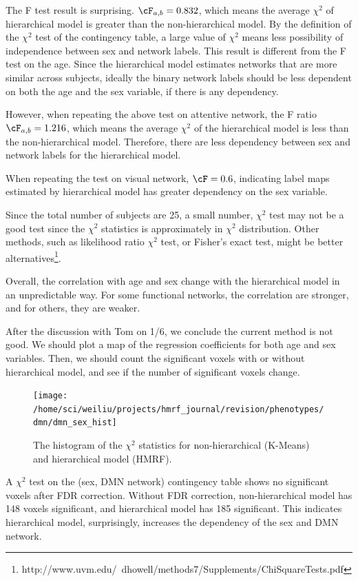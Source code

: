 \documentclass[12pt]{article}
\begin{document}
The F test result is surprising. $\cF_{a,b} = 0.832$, which means the average
$\chi^2$ of hierarchical model is greater than the non-hierarchical model. By
the definition of the $\chi^2$ test of the contingency table, a large value of
$\chi^2$ means less possibility of independence between sex and network
labels. This result is different from the F test on the age. Since the
hierarchical model estimates networks that are more similar across subjects,
ideally the binary network labels should be less dependent on both the age and
the sex variable, if there is any dependency. 

However, when repeating the above test on attentive network, the F ratio
$\cF_{a,b} = 1.216$, which means the average $\chi^2$ of the hierarchical model
is less than the non-hierarchical model. Therefore, there are less dependency
between sex and network labels for the hierarchical model.

When repeating the test on visual network, $\cF = 0.6$, indicating label maps
estimated by hierarchical model has greater dependency on the sex variable. 

Since the total number of subjects are 25, a small number, $\chi^2$ test may not
be a good test since the $\chi^2$ statistics is approximately in $\chi^2$
distribution. Other methods, such as likelihood ratio $\chi^2$ test, or Fisher's
exact test, might be better
alternatives\footnote{http://www.uvm.edu/~dhowell/methods7/Supplements/ChiSquareTests.pdf}.

Overall, the correlation with age and sex change with the hierarchical model in
an unpredictable way. For some functional networks, the correlation are
stronger, and for others, they are weaker. 


After the discussion with Tom on 1/6, we conclude the current method is not
good. We should plot a map of the regression coefficients for both age and sex
variables. Then, we should count the significant voxels with or without
hierarchical model, and see if the number of significant voxels change.


\begin{figure}[htb]
  \centering
  \texttt{[image: /home/sci/weiliu/projects/hmrf\_journal/revision/phenotypes/dmn/dmn\_sex\_hist]}
  \caption{The histogram of the $\chi^2$ statistics for non-hierarchical
    (K-Means) and hierarchical model (HMRF). }
\end{figure}

A $\chi^2$ test on the (sex, DMN network) contingency table shows no significant
voxels after FDR correction. Without FDR correction, non-hierarchical model has
148 voxels significant, and hierarchical model has 185 significant. This
indicates hierarchical model, surprisingly, increases the dependency of the sex
and DMN network.
\end{document}
